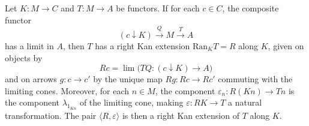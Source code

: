 Let $K: M \to C$ and $T: M \to A$ be functors. If for each $c \in C$, the composite functor
$$(c \downarrow K) \xrightarrow{Q} M \xrightarrow{T} A$$
has a limit in $A$, then $T$ has a right Kan extension $\mathrm{Ran}_K T = R$ along $K$, given on objects by
$$Rc = \lim\big( T Q: (c \downarrow K) \to A \big)$$
and on arrows $g: c \to c'$ by the unique map $Rg: Rc \to Rc'$ commuting with the limiting cones. Moreover, for each $n \in M$, the component $\varepsilon_n: R(Kn) \to Tn$ is the component $\lambda_{1_{Kn}}$ of the limiting cone, making $\varepsilon: RK \to T$ a natural transformation. The pair $\langle R, \varepsilon \rangle$ is then a right Kan extension of $T$ along $K$.
